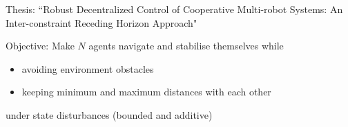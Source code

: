 \begin{frame}{\small Thesis: ``Robust Decentralized Control of Cooperative Multi-robot Systems: An Inter-constraint Receding Horizon Approach"}

  Objective: Make $N$ agents navigate and stabilise themselves while
  \begin{itemize}
    \item avoiding environment obstacles
    \item keeping minimum and maximum distances with each other
  \end{itemize}
  under state disturbances (bounded and additive)

\end{frame}
